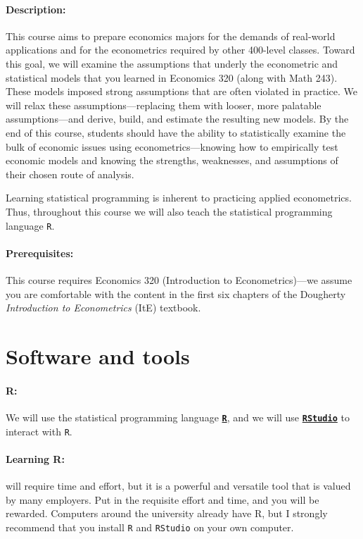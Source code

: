 \documentclass[10pt]{article}
\begin{document}
\paragraph{Description:} This course aims to prepare economics majors for the demands of real-world applications and for the econometrics required by other 400-level classes. Toward this goal, we will examine the assumptions that underly the econometric and statistical models that you learned in Economics 320 (along with Math 243). These models imposed strong assumptions that are often violated in practice. We will relax these assumptions---replacing them with looser, more palatable assumptions---and derive, build, and estimate the resulting new models. By the end of this course, students should have the ability to statistically examine the bulk of economic issues using econometrics---knowing how to empirically test economic models and knowing the strengths, weaknesses, and assumptions of their chosen route of analysis.

Learning statistical programming is inherent to practicing applied econometrics. Thus, throughout this course we will also teach the statistical programming language \texttt{{R}}.

\paragraph{Prerequisites:} This course requires Economics 320 (Introduction to Econometrics)---we assume you are comfortable with the content in the first six chapters of the Dougherty \textit{Introduction to Econometrics} (ItE) textbook.

\section*{Software and tools}

\paragraph{R:} We will use the statistical programming language \href{https://www.r-project.org/}{\textbf{\texttt{R}}}, and we will use \href{https://posit.co/products/open-source/rstudio/}{\textbf{\texttt{RStudio}}} to interact with \texttt{R}.

\paragraph{Learning R:} will require time and effort, but it is a powerful and versatile tool that is valued by many employers. Put in the requisite effort and time, and you will be rewarded. Computers around the university already have R, but I strongly recommend that you install \texttt{R} and \texttt{RStudio} on your own computer.
\end{document}
